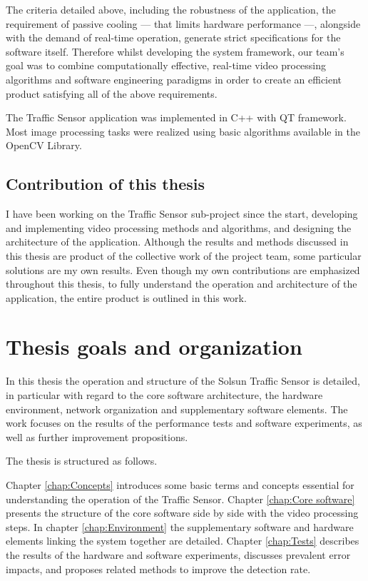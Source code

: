The criteria detailed above, including the robustness of the application, the requirement of passive cooling --- that limits hardware performance ---, alongside with the demand of real-time operation, generate strict specifications for the software itself.
Therefore whilst developing the system framework, our team's goal was to combine computationally effective, real-time video processing algorithms and software engineering paradigms in order to create an efficient product satisfying all of the above requirements.

The Traffic Sensor application was implemented in C++ with QT framework.
Most image processing tasks were realized using basic algorithms available in the OpenCV Library.

\subsection{Contribution of this thesis}\label{sec:contribution_of_the_thesis}

I have been working on the Traffic Sensor sub-project since the start, developing and implementing video processing methods and algorithms, and designing the architecture of the application.
Although the results and methods discussed in this thesis are product of the collective work of the project team, some particular solutions are my own results. 
Even though my own contributions are emphasized throughout this thesis, to fully understand the operation and architecture of the application, the entire product is outlined in this work.

\section{Thesis goals and organization}
In this thesis the operation and structure of the Solsun Traffic Sensor is detailed, in particular with regard to the core software architecture, the hardware environment, network organization and supplementary software elements.
The work focuses on the results of the performance tests and software experiments, as well as further improvement propositions.

The thesis is structured as follows.

Chapter \ref{chap:Concepts} introduces some basic terms and concepts essential for understanding the operation of the Traffic Sensor. 
Chapter \ref{chap:Core software} presents the structure of the core software side by side with the video processing steps.
In chapter \ref{chap:Environment} the supplementary software and hardware elements linking the system together are detailed.
Chapter \ref{chap:Tests} describes the results of the hardware and software experiments, discusses prevalent error impacts, and proposes related methods to improve the detection rate.
